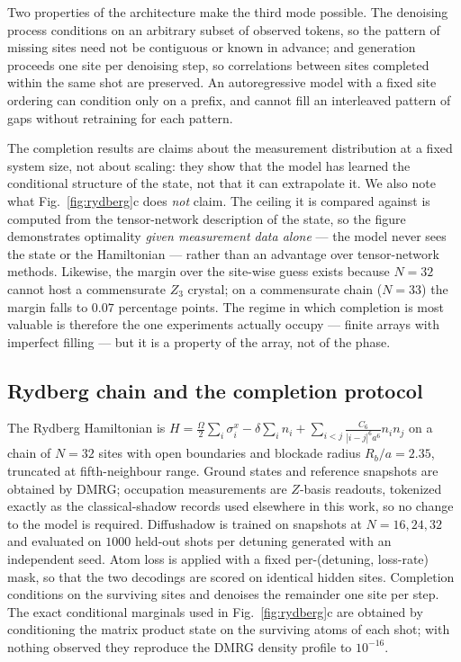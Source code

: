 Two properties of the architecture make the third mode possible. The
denoising process conditions on an arbitrary subset of observed tokens, so
the pattern of missing sites need not be contiguous or known in advance; and
generation proceeds one site per denoising step, so correlations between
sites completed within the same shot are preserved. An autoregressive model
with a fixed site ordering can condition only on a prefix, and cannot fill an
interleaved pattern of gaps without retraining for each pattern.

The completion results are claims about the measurement distribution at a
fixed system size, not about scaling: they show that the model has learned
the conditional structure of the state, not that it can extrapolate it. We
also note what Fig.~\ref{fig:rydberg}c does \emph{not} claim. The ceiling it
is compared against is computed from the tensor-network description of the
state, so the figure demonstrates optimality \emph{given measurement data
alone} --- the model never sees the state or the Hamiltonian --- rather than
an advantage over tensor-network methods. Likewise, the margin over the
site-wise guess exists because $N=32$ cannot host a commensurate $Z_3$
crystal; on a commensurate chain ($N=33$) the margin falls to $0.07$
percentage points. The regime in which completion is most valuable is
therefore the one experiments actually occupy --- finite arrays with
imperfect filling --- but it is a property of the array, not of the phase.


\subsection{Rydberg chain and the completion protocol}
The Rydberg Hamiltonian is
$H = \frac{\Omega}{2}\sum_i \sigma^x_i - \delta\sum_i n_i
+ \sum_{i<j} \frac{C_6}{|i-j|^6 a^6} n_i n_j$
on a chain of $N=32$ sites with open boundaries and blockade radius
$R_b/a = 2.35$, truncated at fifth-neighbour range. Ground states and
reference snapshots are obtained by DMRG; occupation measurements are
$Z$-basis readouts, tokenized exactly as the classical-shadow records used
elsewhere in this work, so no change to the model is required. Diffushadow is
trained on snapshots at $N = 16, 24, 32$ and evaluated on $1000$ held-out
shots per detuning generated with an independent seed. Atom loss is applied
with a fixed per-(detuning, loss-rate) mask, so that the two decodings are
scored on identical hidden sites. Completion conditions on the surviving
sites and denoises the remainder one site per step. The exact conditional
marginals used in Fig.~\ref{fig:rydberg}c are obtained by conditioning the
matrix product state on the surviving atoms of each shot; with nothing
observed they reproduce the DMRG density profile to $10^{-16}$.

